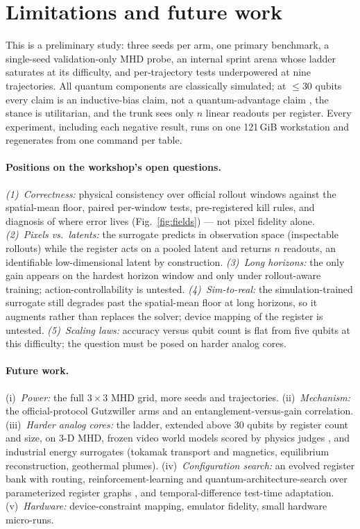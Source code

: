 \documentclass{article}
\begin{document}
\section{Limitations and future work}
\label{sec:limitations}

This is a preliminary study: three seeds per arm, one primary benchmark, a
single-seed validation-only MHD probe, an internal sprint arena whose
ladder saturates at its difficulty, and per-trajectory tests underpowered
at nine trajectories. All quantum components are classically simulated; at
$\le$30 qubits every claim is an inductive-bias claim, not a
quantum-advantage claim \citep{schuld2022advantage,cerezo2025barren}, the
stance is utilitarian, and the trunk sees only $n$ linear readouts per
register. Every experiment, including each negative result, runs on one
121\,GiB workstation and regenerates from one command per table.

\paragraph{Positions on the workshop's open questions.}
\emph{(1)~Correctness:} physical consistency over official rollout windows
against the spatial-mean floor, paired per-window tests, pre-registered
kill rules, and diagnosis of where error lives (Fig.~\ref{fig:fields}) ---
not pixel fidelity alone. \emph{(2)~Pixels vs.\ latents:} the surrogate
predicts in observation space (inspectable rollouts) while the register
acts on a pooled latent and returns $n$ readouts, an identifiable
low-dimensional latent by construction. \emph{(3)~Long horizons:} the only
gain appears on the hardest horizon window and only under rollout-aware
training; action-controllability is untested. \emph{(4)~Sim-to-real:} the
simulation-trained surrogate still degrades past the spatial-mean floor at
long horizons, so it augments rather than replaces the solver; device
mapping of the register is untested. \emph{(5)~Scaling laws:} accuracy
versus qubit count is flat from five qubits at this difficulty; the
question must be posed on harder analog cores.

\paragraph{Future work.} (i)~\emph{Power:} the full $3{\times}3$ MHD grid,
more seeds and trajectories. (ii)~\emph{Mechanism:} the official-protocol Gutzwiller arms and an entanglement-versus-gain correlation. (iii)~\emph{Harder analog cores:} the ladder, extended above
30 qubits by register count and size, on 3-D MHD, frozen video world
models scored by physics judges
\citep{gao2026lingbotworld,wan2025wan,motamed2025physicsiq,li2025worldmodelbench},
and industrial energy surrogates (tokamak transport and magnetics,
equilibrium reconstruction, geothermal plumes). (iv)~\emph{Configuration
search:} an evolved register bank with routing, reinforcement-learning and
quantum-architecture-search over parameterized register graphs
\citep{zoph2017neural,du2022quantum}, and temporal-difference test-time
adaptation. (v)~\emph{Hardware:} device-constraint mapping, emulator fidelity, small hardware micro-runs.



\end{document}
